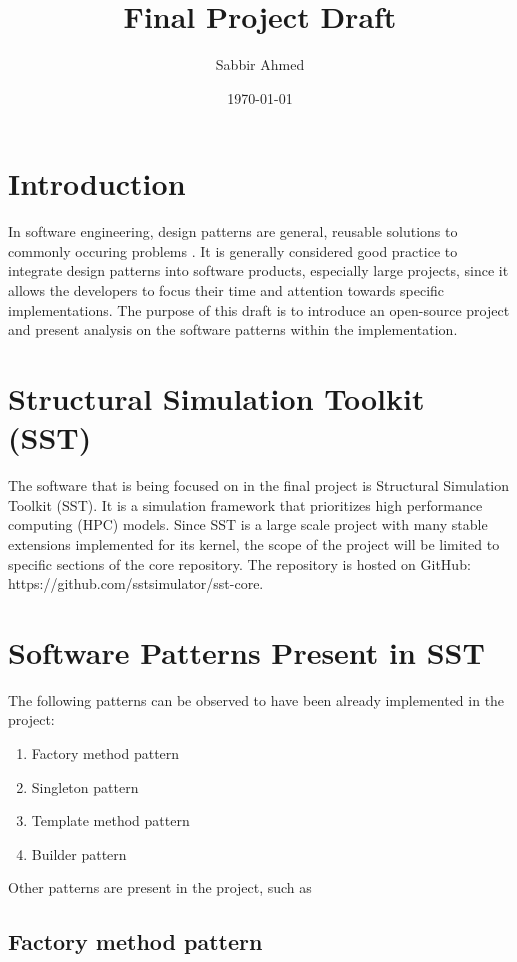 \documentclass[titlepage]{article}
\title{Final Project Draft}
\author{Sabbir Ahmed}
\date{\today}
\begin{document}
\maketitle

\section{Introduction}
In software engineering, design patterns are general, reusable solutions to commonly occuring problems \cite{source-making}. It is generally considered good practice to integrate design patterns into software products, especially large projects, since it allows the developers to focus their time and attention towards specific implementations. The purpose of this draft is to introduce an open-source project and present analysis on the software patterns within the implementation.

\section{Structural Simulation Toolkit (SST)}
The software that is being focused on in the final project is Structural Simulation Toolkit (SST). It is a simulation framework that prioritizes high performance computing (HPC) models. Since SST is a large scale project with many stable extensions implemented for its kernel, the scope of the project will be limited to specific sections of the core repository. The repository is hosted on GitHub: https://github.com/sstsimulator/sst-core.

\section{Software Patterns Present in SST}
The following patterns can be observed to have been already implemented in the project:
\begin{enumerate}
    \item Factory method pattern
    \item Singleton pattern
    \item Template method pattern
    \item Builder pattern
\end{enumerate}

Other patterns are present in the project, such as 

\subsection{Factory method pattern}
\end{document}

